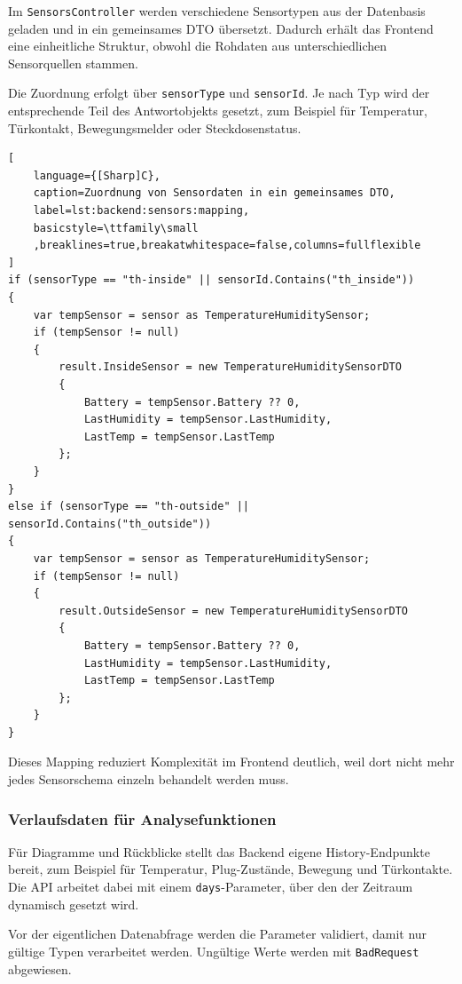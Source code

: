 Im \texttt{SensorsController} werden verschiedene Sensortypen aus der Datenbasis geladen und in ein gemeinsames DTO übersetzt. Dadurch erhält das Frontend eine einheitliche Struktur, obwohl die Rohdaten aus unterschiedlichen Sensorquellen stammen.

Die Zuordnung erfolgt über \texttt{sensorType} und \texttt{sensorId}. Je nach Typ wird der entsprechende Teil des Antwortobjekts gesetzt, zum Beispiel für Temperatur, Türkontakt, Bewegungsmelder oder Steckdosenstatus.

\begin{lstlisting}[
    language={[Sharp]C},
    caption=Zuordnung von Sensordaten in ein gemeinsames DTO,
    label=lst:backend:sensors:mapping,
    basicstyle=\ttfamily\small
    ,breaklines=true,breakatwhitespace=false,columns=fullflexible
]
if (sensorType == "th-inside" || sensorId.Contains("th_inside"))
{
    var tempSensor = sensor as TemperatureHumiditySensor;
    if (tempSensor != null)
    {
        result.InsideSensor = new TemperatureHumiditySensorDTO
        {
            Battery = tempSensor.Battery ?? 0,
            LastHumidity = tempSensor.LastHumidity,
            LastTemp = tempSensor.LastTemp
        };
    }
}
else if (sensorType == "th-outside" || sensorId.Contains("th_outside"))
{
    var tempSensor = sensor as TemperatureHumiditySensor;
    if (tempSensor != null)
    {
        result.OutsideSensor = new TemperatureHumiditySensorDTO
        {
            Battery = tempSensor.Battery ?? 0,
            LastHumidity = tempSensor.LastHumidity,
            LastTemp = tempSensor.LastTemp
        };
    }
}
\end{lstlisting}

Dieses Mapping reduziert Komplexität im Frontend deutlich, weil dort nicht mehr jedes Sensorschema einzeln behandelt werden muss.

\subsubsection{Verlaufsdaten für Analysefunktionen}

Für Diagramme und Rückblicke stellt das Backend eigene History-Endpunkte bereit, zum Beispiel für Temperatur, Plug-Zustände, Bewegung und Türkontakte. Die API arbeitet dabei mit einem \texttt{days}-Parameter, über den der Zeitraum dynamisch gesetzt wird.

Vor der eigentlichen Datenabfrage werden die Parameter validiert, damit nur gültige Typen verarbeitet werden. Ungültige Werte werden mit \texttt{BadRequest} abgewiesen.

